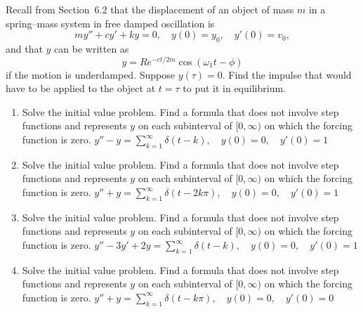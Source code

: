 \documentclass{ximera}
\begin{document}
\begin{problem}\label{exer:8.7.29}

Recall from Section~6.2 that the displacement of
an
object of mass $m$ in a spring--mass system in free damped oscillation is
$$
my''+cy'+ky=0, \quad  y(0)=y_0,\quad y'(0)=v_0,
$$
and that $y$ can be written as
$$
y=Re^{-ct/2m}\cos(\omega_1t-\phi)
$$
if the motion is underdamped. Suppose $y(\tau)=0$.
Find the impulse that would have to be applied to the object at $t=\tau$
 to put it in equilibrium.
\end{problem}

\begin{problem}\label{exer:8.7.30}
\begin{enumerate}

\item Solve the initial value problem. Find a formula that
does not involve step functions and represents $y$  on each subinterval of $[0,\infty)$ on which the forcing function is zero.
$y''-y=\sum_{k=1}^\infty\delta(t-k), \quad  y(0)=0,\quad y'(0)=1$

\item Solve the initial value problem. Find a formula that
does not involve step functions and represents $y$  on each subinterval of $[0,\infty)$ on which the forcing function is zero.
$y''+y=\sum_{k=1}^\infty\delta(t-2k\pi), \quad  y(0)=0,\quad y'(0)=1$

\item Solve the initial value problem. Find a formula that
does not involve step functions and represents $y$  on each subinterval of $[0,\infty)$ on which the forcing function is zero.
$y''-3y'+2y=\sum_{k=1}^\infty\delta(t-k), \quad  y(0)=0,\quad y'(0)=1$

\item Solve the initial value problem. Find a formula that
does not involve step functions and represents $y$  on each subinterval of $[0,\infty)$ on which the forcing function is zero.
$y''+y=\sum_{k=1}^\infty\delta(t-k\pi), \quad  y(0)=0,\quad y'(0)=0$
\end{enumerate}
\end{problem}
\end{document}
